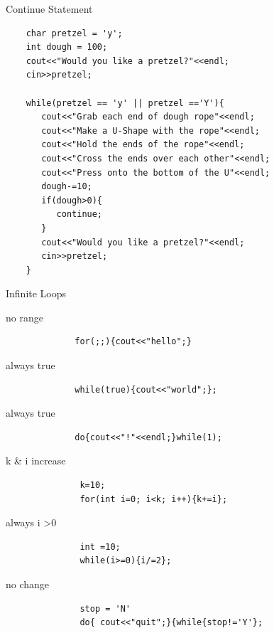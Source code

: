 \documentclass[xcolor={dvipsnames}]{beamer}
\begin{document}
\begin{frame}[fragile]{Continue Statement}
\begin{verbatim}
    char pretzel = 'y';
    int dough = 100;
    cout<<"Would you like a pretzel?"<<endl;
    cin>>pretzel;

    while(pretzel == 'y' || pretzel =='Y'){
       cout<<"Grab each end of dough rope"<<endl;
       cout<<"Make a U-Shape with the rope"<<endl;
       cout<<"Hold the ends of the rope"<<endl;
       cout<<"Cross the ends over each other"<<endl;
       cout<<"Press onto the bottom of the U"<<endl; 
       dough-=10;
       if(dough>0){
          continue;     
       }
       cout<<"Would you like a pretzel?"<<endl;
       cin>>pretzel;
    }
\end{verbatim}
\end{frame}

\begin{frame}[fragile]{Infinite Loops}
	\begin{description}
	\item[no range]
	\begin{verbatim}
		for(;;){cout<<"hello";}
	\end{verbatim}

	\item[always true]
	\begin{verbatim}
		while(true){cout<<"world";};
	\end{verbatim}
	\item[always true]
	\begin{verbatim}
		do{cout<<"!"<<endl;}while(1);
	\end{verbatim}

	\item[k \& i increase]
	\begin{verbatim}
	     k=10;
	     for(int i=0; i<k; i++){k+=i};
	\end{verbatim}

	\item[always i \textgreater 0]
	\begin{verbatim}
	     int =10;
	     while(i>=0){i/=2};
	\end{verbatim}
	
	\item[no change]
	\begin{verbatim}
	     stop = 'N'
	     do{ cout<<"quit";}{while{stop!='Y'};
	\end{verbatim}

	\end{description}
	
\end{frame}
\end{document}
